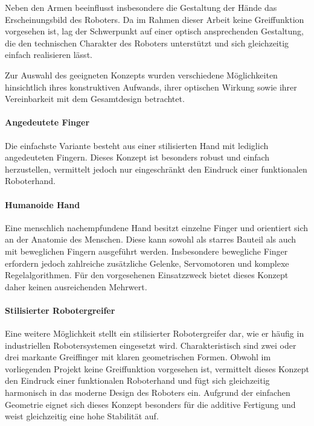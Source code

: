 Neben den Armen beeinflusst insbesondere die Gestaltung der Hände das Erscheinungsbild des Roboters. Da im Rahmen dieser Arbeit keine Greiffunktion vorgesehen ist, lag der Schwerpunkt auf einer optisch ansprechenden Gestaltung, die den technischen Charakter des Roboters unterstützt und sich gleichzeitig einfach realisieren lässt.

Zur Auswahl des geeigneten Konzepts wurden verschiedene Möglichkeiten hinsichtlich ihres konstruktiven Aufwands, ihrer optischen Wirkung sowie ihrer Vereinbarkeit mit dem Gesamtdesign betrachtet.

\paragraph{Angedeutete Finger}

Die einfachste Variante besteht aus einer stilisierten Hand mit lediglich angedeuteten Fingern. Dieses Konzept ist besonders robust und einfach herzustellen, vermittelt jedoch nur eingeschränkt den Eindruck einer funktionalen Roboterhand.

\paragraph{Humanoide Hand}

Eine menschlich nachempfundene Hand besitzt einzelne Finger und orientiert sich an der Anatomie des Menschen. Diese kann sowohl als starres Bauteil als auch mit beweglichen Fingern ausgeführt werden. Insbesondere bewegliche Finger erfordern jedoch zahlreiche zusätzliche Gelenke, Servomotoren und komplexe Regelalgorithmen. Für den vorgesehenen Einsatzzweck bietet dieses Konzept daher keinen ausreichenden Mehrwert.

\paragraph{Stilisierter Robotergreifer}

Eine weitere Möglichkeit stellt ein stilisierter Robotergreifer dar, wie er häufig in industriellen Robotersystemen eingesetzt wird. Charakteristisch sind zwei oder drei markante Greiffinger mit klaren geometrischen Formen. Obwohl im vorliegenden Projekt keine Greiffunktion vorgesehen ist, vermittelt dieses Konzept den Eindruck einer funktionalen Roboterhand und fügt sich gleichzeitig harmonisch in das moderne Design des Roboters ein. Aufgrund der einfachen Geometrie eignet sich dieses Konzept besonders für die additive Fertigung und weist gleichzeitig eine hohe Stabilität auf.

